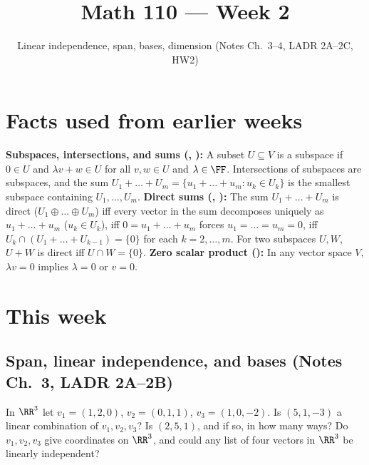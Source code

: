 \documentclass[10pt]{scrartcl}
\title{Math 110 --- Week 2}
\subtitle{Linear independence, span, bases, dimension (Notes Ch.~3--4, LADR 2A--2C, HW2)}
\author{}\date{}\ihead{}
\begin{document}
\setlength{\parskip}{3pt}
\maketitle

\section{Facts used from earlier weeks}
\begin{enumerate}[label=(W\arabic*),leftmargin=2.8em,itemsep=4pt]
  \ii \textbf{Subspaces, intersections, and sums (, ):} A subset $U\subseteq V$ is a subspace if $0\in U$ and $\lambda v+w\in U$ for all $v,w\in U$ and $\lambda\in\FF$. Intersections of subspaces are subspaces, and the sum $U_1+\dots+U_m=\{u_1+\dots+u_m:u_k\in U_k\}$ is the smallest subspace containing $U_1,\dots,U_m$.
  \ii \textbf{Direct sums (, ):} The sum $U_1+\dots+U_m$ is direct ($U_1\oplus\dots\oplus U_m$) iff every vector in the sum decomposes uniquely as $u_1+\dots+u_m$ ($u_k\in U_k$), iff $0=u_1+\dots+u_m$ forces $u_1=\dots=u_m=0$, iff $U_k\cap(U_1+\dots+U_{k-1})=\{0\}$ for each $k=2,\dots,m$. For two subspaces $U,W$, $U+W$ is direct iff $U\cap W=\{0\}$.
  \ii \textbf{Zero scalar product ():} In any vector space $V$, $\lambda v=0$ implies $\lambda=0$ or $v=0$.
\end{enumerate}

\section{This week}

\subsection{Span, linear independence, and bases (Notes Ch.~3, LADR 2A--2B)}

\begin{qbox}
  In $\RR^3$ let $v_1=(1,2,0)$, $v_2=(0,1,1)$, $v_3=(1,0,-2)$. Is $(5,1,-3)$ a linear combination of $v_1,v_2,v_3$? Is $(2,5,1)$, and if so, in how many ways? Do $v_1,v_2,v_3$ give coordinates on $\RR^3$, and could any list of four vectors in $\RR^3$ be linearly independent?
\end{qbox}
\end{document}
